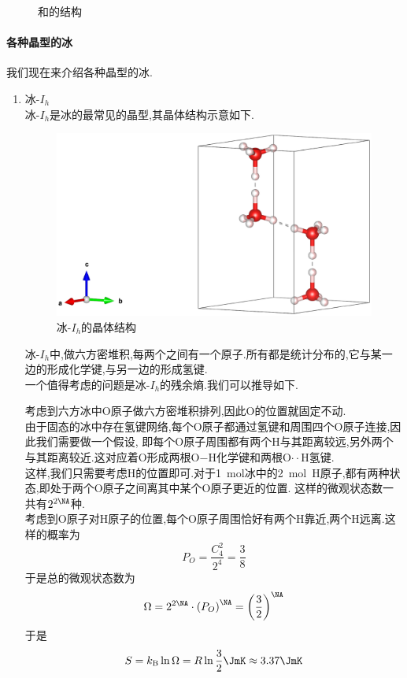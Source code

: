 \documentclass{ctexart}
\begin{document}
\begin{enumerate}[label=\tbf{\arabic*},topsep=0pt,parsep=0pt,itemsep=0pt,partopsep=0pt]
\begin{figure}[H]
            \caption{\ce{[(C9H18)3(NH)2Cl]^+}和的结构}
        \end{figure}
\end{enumerate}
\paragraph{各种晶型的冰}我们现在来介绍各种晶型的冰.
\begin{enumerate}[label=\tbf{\arabic*},topsep=0pt,parsep=0pt,itemsep=0pt,partopsep=0pt]
    \item 冰-$I_h$\\
        冰-$I_h$是冰的最常见的晶型,其晶体结构示意如下.
        \begin{figure}[H]
            \centering\includegraphics[scale=0.125]{picture/Ih-Ice.eps}
            \caption{冰-$I_h$的晶体结构}
        \end{figure}
        冰-$I_h$中,做六方密堆积,每两个之间有一个原子.所有都是统计分布的,它与某一边的形成化学键,与另一边的形成氢键.\\
        一个值得考虑的问题是冰-$I_h$的残余熵.我们可以推导如下.
        \begin{derivation}
            考虑到六方冰中O原子做六方密堆积排列,因此O的位置就固定不动.\\
            由于固态的冰中存在氢键网络,每个O原子都通过氢键和周围四个O原子连接,因此我们需要做一个假设,%
            即每个O原子周围都有两个H与其距离较远,另外两个与其距离较近.这对应着O形成两根O$-$H化学键和两根O$\cdot\cdot$H氢键.\\
            这样,我们只需要考虑H的位置即可.对于1\ mol冰中的2\ mol\ H原子,都有两种状态,即处于两个O原子之间离其中某个O原子更近的位置.%
            这样的微观状态数一共有$2^{2\NA}$种.\\
            考虑到O原子对H原子的位置,每个O原子周围恰好有两个H靠近,两个H远离.这样的概率为
            \[P_O=\dfrac{C_4^2}{2^4}=\dfrac{3}{8}\]
            于是总的微观状态数为
            \[\Omega=2^{2\NA}\cdot\left(P_O\right)^{\NA}=\left(\dfrac32\right)^{\NA}\]
            于是
            \[S=k_\text B\ln\Omega=R\ln\dfrac32\JmK\approx3.37\JmK\]
            

\end{derivation}
\end{enumerate}
\end{document}
